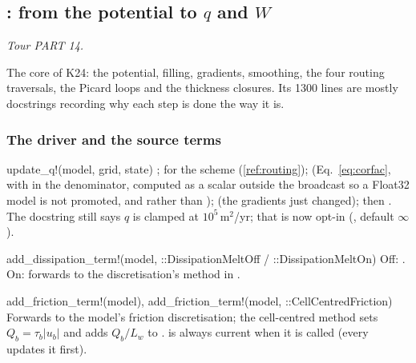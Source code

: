 \subsection{: from the potential to $q$ and $W$}\label{ref:waterflux}
\emph{Tour PART 14.}

The core of K24: the potential, filling, gradients, smoothing, the four routing traversals, the Picard loops and the
thickness closures. Its 1300 lines are mostly docstrings recording why each step is done the way it is.

\subsubsection*{The driver and the source terms}
\begin{fnlist}
\item[update\_q!(model, grid, state)] ;  for the scheme (\ref{ref:routing}); 
  (Eq.~\ref{eq:corfac}, with  in the denominator, computed as a scalar outside the broadcast so a Float32 model is not
  promoted, and  rather than );  (the gradients just changed); then
  . The docstring still says $q$ is clamped at
  $10^5$\,m$^2$/yr; that is now opt-in (, default $\infty$).
\item[add\_dissipation\_term!(model, ::DissipationMeltOff / ::DissipationMeltOn)] Off: . On: forwards to the
  discretisation's method in .
\item[add\_friction\_term!(model), add\_friction\_term!(model, ::CellCentredFriction)] Forwards to the model's friction discretisation;
  the cell-centred method sets $Q_b = \tau_b|u_b|$ and adds $Q_b/L_w$ to .  is always current when it
  is called (every  updates it first).
\end{fnlist}

